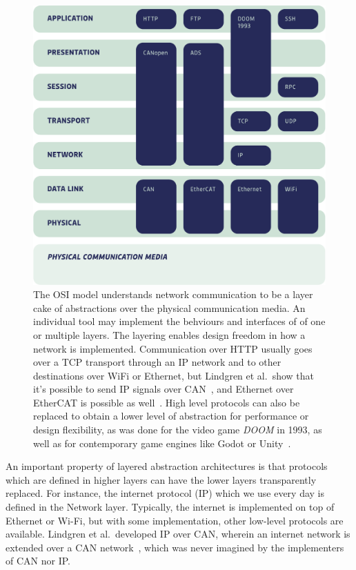 \documentclass[english,12pt,a4paper,pdftex,eng,utf8]{aaltothesis}
\begin{document}
\begin{figure}[h]
  \centering
  \includegraphics[width=\textwidth]{assets/osi_model}
  \caption{The OSI model understands network communication to be a layer cake of abstractions over the physical communication media.  An individual tool may implement the behviours and interfaces of of one or multiple layers.  The layering enables design freedom in how a network is implemented.  Communication over HTTP usually goes over a TCP transport through an IP network and to other destinations over WiFi or Ethernet, but Lindgren et al.\ show that it's possible to send IP signals over CAN~\cite{Lindgren2008}, and Ethernet over EtherCAT is possible as well~\cite[§1.9.3]{EtherCATFieldbus}.  High level protocols can also be replaced to obtain a lower level of abstraction for performance or design flexibility, as was done for the video game \emph{DOOM} in 1993, as well as for contemporary game engines like Godot or Unity~\cite{DOOM1993,GodotMultiplayer,UnityTransport}.}\label{fig:osi_model}
\end{figure}

An important property of layered abstraction architectures is that protocols which are defined in higher layers can have the lower layers transparently replaced. For instance, the internet protocol (IP) which we use every day is defined in the Network layer. Typically, the internet is implemented on top of Ethernet or Wi-Fi, but with some implementation, other low-level protocols are available. Lindgren et al.\ developed IP over CAN, wherein an internet network is extended over a CAN network~\cite{Lindgren2008}, which was never imagined by the implementers of CAN nor IP.
\end{document}
